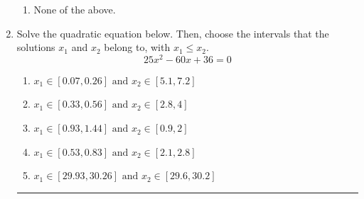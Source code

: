 \documentclass[14pt]{extbook}
\newcommand{\litem}[1]{\item#1\hspace*{-1cm}\rule{\textwidth}{0.4pt}}
\begin{document}
\begin{enumerate}
{\begin{enumerate}[label=\Alph*.]
\item None of the above.
\end{enumerate} }
\litem{
Solve the quadratic equation below. Then, choose the intervals that the solutions $x_1$ and $x_2$ belong to, with $x_1 \leq x_2$.\[ 25x^{2} -60 x + 36 = 0 \]\begin{enumerate}[label=\Alph*.]
\item \( x_1 \in [0.07, 0.26] \text{ and } x_2 \in [5.1, 7.2] \)
\item \( x_1 \in [0.33, 0.56] \text{ and } x_2 \in [2.8, 4] \)
\item \( x_1 \in [0.93, 1.44] \text{ and } x_2 \in [0.9, 2] \)
\item \( x_1 \in [0.53, 0.83] \text{ and } x_2 \in [2.1, 2.8] \)
\item \( x_1 \in [29.93, 30.26] \text{ and } x_2 \in [29.6, 30.2] \)


\end{enumerate}}
\end{enumerate}
\end{document}
